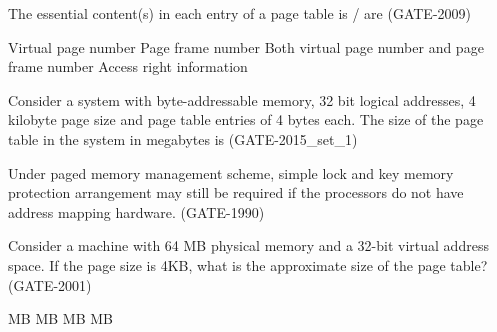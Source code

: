 
\begin{questyle}

  \question  The essential content(s) in each entry of a page table is / are (GATE-2009)

  \begin{choices}
    \choice Virtual page number
    \choice Page frame number
    \choice Both virtual page number and page frame number
    \choice Access right information
  \end{choices}

\end{questyle}


\begin{questyle}

  \question  Consider a system with byte-addressable memory, 32 bit logical addresses, 4 kilobyte page size and page table entries of 4 bytes each. The size of the page table in the system in megabytes is \fillin[] (GATE-2015\_set\_1)

\end{questyle}


\begin{questyle}

  \question  Under paged memory management scheme, simple lock and key memory protection arrangement may still be required if the \fillin[] processors do not have address mapping hardware. (GATE-1990)

\end{questyle}


\begin{questyle}

  \question  Consider a machine with 64 MB physical memory and a 32-bit virtual address space. If the page size is 4KB, what
              is the approximate size of the page table?(GATE-2001)

  \begin{choices}
     MB
     MB
     MB
     MB
  \end{choices}

\end{questyle}

